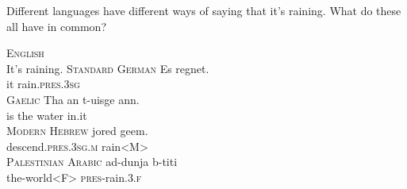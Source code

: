 \documentclass{article}
\begin{document}
Different languages have different ways of saying that it's raining. What do these all have in common?

\ea \label{ex:top3}
    \ea \textsc{English}\\
        It's raining.
    \ex \textsc{Standard German}
        \gll Es regnet. \\
        it rain.\textsc{pres.3sg} \\
    \ex \textsc{Gaelic}
        \gll Tha an t-uisge ann. \\
         is the water in.it \\
    \ex \textsc{Modern Hebrew}
        \gll jored geem. \\
        descend.\textsc{pres.3sg.m} rain\textsc{<M>} \\
    \ex \textsc{Palestinian Arabic}
        \gll ad-dunja b-titi \\
        the-world\textsc{<F>} \textsc{pres}-rain.\textsc{3.f} \\
    \z
\z
\end{document}
